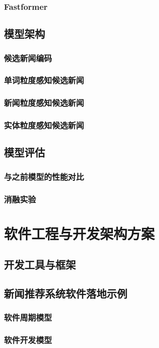 \documentclass[withoutpreface,bwprint]{cumcmthesis} %
\begin{document}
	\subsubsection{ Fastformer}
	\subsection{模型架构}
	\subsubsection{ 候选新闻编码}
	\subsubsection{ 单词粒度感知候选新闻}
	\subsubsection{ 新闻粒度感知候选新闻}
	\subsubsection{ 实体粒度感知候选新闻}
	\subsection{模型评估}
	\subsubsection{ 与之前模型的性能对比}
	\subsubsection{ 消融实验}
	\newpage
	\section{软件工程与开发架构方案}
	\subsection{开发工具与框架}
	\subsection{新闻推荐系统软件落地示例}
	\subsubsection{ 软件周期模型}
	\subsubsection{ 软件开发模型}
\end{document}
